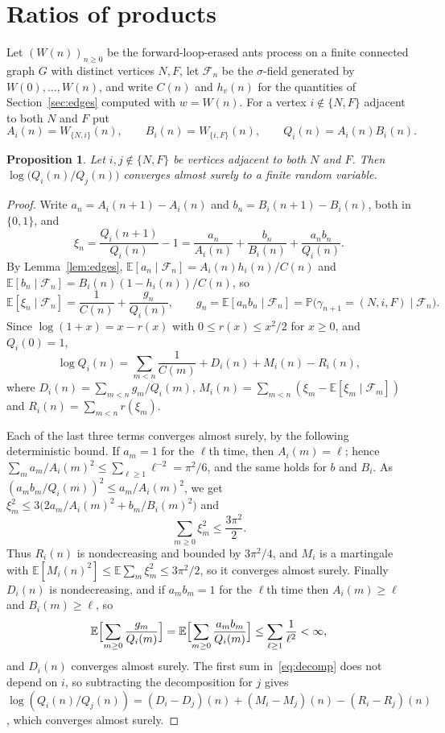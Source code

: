 \documentclass[11pt]{amsart}
\newtheorem{proposition}[theorem]{Proposition}
\theoremstyle{remark}
\newcommand{\E}{\mathbb{E}}
\newcommand{\Prob}{\mathbb{P}}
\newcommand{\F}{\mathcal{F}}
\begin{document}
\section{Ratios of products}\label{sec:ratio}

Let $(W(n))_{n\ge0}$ be the forward-loop-erased ants process on a finite connected graph $G$ with distinct vertices
$N,F$, let $\F_n$ be the $\sigma$-field generated by $W(0),\dots,W(n)$, and write $C(n)$ and $h_v(n)$ for the
quantities of Section~\ref{sec:edges} computed with $w=W(n)$. For a vertex $i\notin\{N,F\}$ adjacent to both $N$ and $F$
put
\[
A_i(n)=W_{\{N,i\}}(n),\qquad B_i(n)=W_{\{i,F\}}(n),\qquad Q_i(n)=A_i(n)B_i(n).
\]

\begin{proposition}\label{prop:ratio}
Let $i,j\notin\{N,F\}$ be vertices adjacent to both $N$ and $F$. Then $\log\bigl(Q_i(n)/Q_j(n)\bigr)$ converges almost
surely to a finite random variable.
\end{proposition}

\begin{proof}
Write $a_n=A_i(n+1)-A_i(n)$ and $b_n=B_i(n+1)-B_i(n)$, both in $\{0,1\}$, and
\[
\xi_n=\frac{Q_i(n+1)}{Q_i(n)}-1=\frac{a_n}{A_i(n)}+\frac{b_n}{B_i(n)}+\frac{a_nb_n}{Q_i(n)}.
\]
By Lemma~\ref{lem:edges}, $\E[a_n\mid\F_n]=A_i(n)h_i(n)/C(n)$ and $\E[b_n\mid\F_n]=B_i(n)(1-h_i(n))/C(n)$, so
\begin{equation}\label{eq:drift}
\E[\xi_n\mid\F_n]=\frac{1}{C(n)}+\frac{g_n}{Q_i(n)},\qquad g_n=\E[a_nb_n\mid\F_n]=\Prob\bigl(\gamma_{n+1}=(N,i,F)\mid\F_n\bigr).
\end{equation}
Since $\log(1+x)=x-r(x)$ with $0\le r(x)\le x^2/2$ for $x\ge0$, and $Q_i(0)=1$,
\begin{equation}\label{eq:decomp}
\log Q_i(n)=\sum_{m<n}\frac{1}{C(m)}+D_i(n)+M_i(n)-R_i(n),
\end{equation}
where $D_i(n)=\sum_{m<n}g_m/Q_i(m)$, $M_i(n)=\sum_{m<n}(\xi_m-\E[\xi_m\mid\F_m])$ and $R_i(n)=\sum_{m<n}r(\xi_m)$.

Each of the last three terms converges almost surely, by the following deterministic bound. If $a_m=1$ for the $\ell$th
time, then $A_i(m)=\ell$; hence $\sum_m a_m/A_i(m)^2\le\sum_{\ell\ge1}\ell^{-2}=\pi^2/6$, and the same holds for $b$ and
$B_i$. As $(a_mb_m/Q_i(m))^2\le a_m/A_i(m)^2$, we get $\xi_m^2\le3\bigl(2a_m/A_i(m)^2+b_m/B_i(m)^2\bigr)$ and
\[
\sum_{m\ge0}\xi_m^2\le\frac{3\pi^2}{2}.
\]
Thus $R_i(n)$ is nondecreasing and bounded by $3\pi^2/4$, and $M_i$ is a martingale with
$\E[M_i(n)^2]\le\E\sum_m\xi_m^2\le3\pi^2/2$, so it converges almost surely. Finally $D_i(n)$ is nondecreasing, and if
$a_mb_m=1$ for the $\ell$th time then $A_i(m)\ge\ell$ and $B_i(m)\ge\ell$, so
\[
\E\Bigl[\sum_{m\ge0}\frac{g_m}{Q_i(m)}\Bigr]=\E\Bigl[\sum_{m\ge0}\frac{a_mb_m}{Q_i(m)}\Bigr]\le\sum_{\ell\ge1}\frac{1}{\ell^2}<\infty,
\]
and $D_i(n)$ converges almost surely. The first sum in~\eqref{eq:decomp} does not depend on $i$, so subtracting the
decomposition for $j$ gives
$\log(Q_i(n)/Q_j(n))=(D_i-D_j)(n)+(M_i-M_j)(n)-(R_i-R_j)(n)$, which converges almost surely.
\end{proof}
\end{document}
